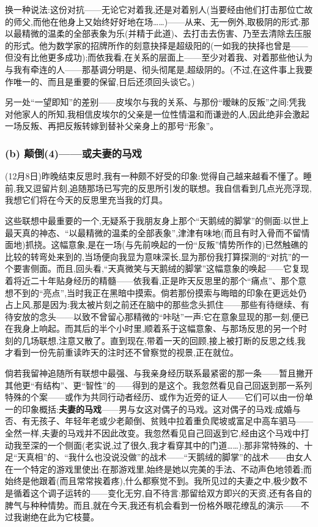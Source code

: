 换一种说法:这份对抗——无论它对着我,还是对着别人(当要经由他们打击那位亡故的师父,而他在他身上又始终好好地在场……)——从来、无一例外,取极阴的形式:那以最精微的温柔的全部表象为乐(并精于此道)、去打击去伤害、乃至去清除去压服的形式。他为数学家的招牌所作的刻意抉择是超级阳的(一如我的抉择也曾是——但没有比他更多成功);而依我看,在关系的层面上——至少对着我、对着那些他认为与我有牵连的人——那基调分明是、彻头彻尾是,超级阴的。(不过,在这件事上我要作唯一的、而且是重要的保留,日后还须回头谈它。)

另一处“一望即知”的差别——皮埃尔与我的关系、与那份“暧昧的反叛”之间:凭我对他家人的所知,我相信皮埃尔的父亲是一位性情温和而谦逊的人,因此绝非会激起一场反叛、再把反叛转嫁到替补父亲身上的那号“形象”。

\subsubsection*{(b) 颠倒(4)——或夫妻的马戏}
\label{ch18:local:h50}

\label{ch18:local:n46}

(12月8日)昨晚结束反思时,我有一种颇不好受的印象:觉得自己越来越看不懂了。睡前,我又逗留片刻,追随那场已写完的反思所引发的联想。我自信看到几点光亮浮现,我想它们将在今天的反思里充当我的灯具。

这些联想中最重要的一个,无疑系于我朋友身上那个“天鹅绒的脚掌”的侧面:以世上最天真的神态、“以最精微的温柔的全部表象”,津津有味地(而且有时入骨而不留情面地)抓挠。这幅意象,是在一场(与先前唤起的一份“反叛”情势所作的)已然触礁的比较的转弯处来到的,当场便向我显为意味深长,显为那份我打算探测的“对抗”的一个要害侧面。而且,回头看,“天真微笑与天鹅绒的脚掌”这幅意象的唤起——它复现着将近二十年贴身经历的精髓——依我看,正是昨天反思里的那个“痛点”、那个意想不到的“亮点”,当时我正在黑暗中摸索。倘若那份摸索与晦暗的印象在更远处仍占上风,那是因为:我太被片刻之前还在脑中的那些念头抓住——那些有待继续、有待安放的念头——以致不曾留心那精微的“咔哒”一声:它在意象显现的那一刻,便已在我身上响起。而其后的半个小时里,顺着系于这幅意象、与那场反思的另一个时刻的几场联想,注意又散了。直到现在,带着一天的回顾,接上被打断的反思之线,我才看到一份先前重读昨天的注时还不曾察觉的视景,正在就位。

倘若我留神追随所有联想中最强、与我亲身经历联系最紧密的那一条——暂且撇开其他更“有结构”、更“智性”的\dmark{}——得到的是这个。我忽然看见自己回返到那一系列特殊的个案——或作为共同行动者经历、或作为近旁的证人——它们可以由一份单一的印象概括:\textbf{夫妻的马戏}——男与女这对偶子的马戏。这对偶子的马戏:成婚与否、有无孩子、年轻年老或少老颠倒、贫贱中拉着重负爬坡或富足中高车驷马——全然一样,夫妻的马戏并不因此改变。我忽然看见自己回返到它,经由这个马戏中打动我至深的一个侧面(老实说,过了很久,我才看穿其中的门道……):那非常特殊的、十足“天真相”的、“我什么也没说没做”的战术——“天鹅绒的脚掌”的战术——由女人在一个特定的游戏里使出:在那游戏里,始终是她以完美的手法、不动声色地领着;而始终是他跟着(而且常常挨着疼),什么都察觉不到。我所见过的夫妻之中,极少数不是循着这个调子运转的——变化无穷,自不待言:那留给双方即兴的天资,还有各自的脾气与种种情势。而且,就在今天,我还有机会看到一份格外眼花缭乱的演示——不过我谢绝在此为它枝蔓。

